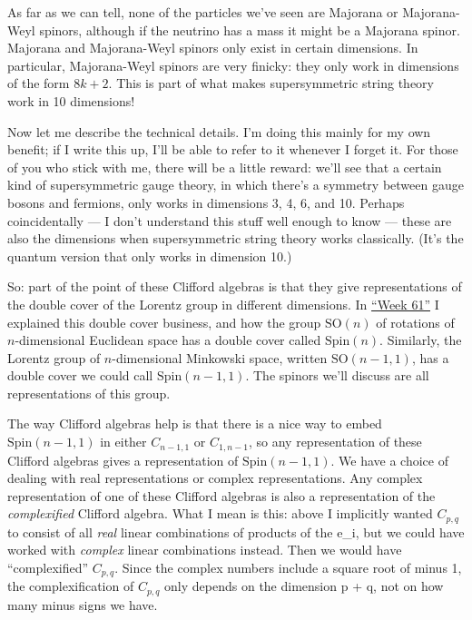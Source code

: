 \documentclass{article}
\begin{document}
As far as we can tell, none of the particles we've seen are Majorana or
Majorana-Weyl spinors, although if the neutrino has a mass it might be a
Majorana spinor. Majorana and Majorana-Weyl spinors only exist in
certain dimensions. In particular, Majorana-Weyl spinors are very
finicky: they only work in dimensions of the form \(8k + 2\). This is
part of what makes supersymmetric string theory work in 10 dimensions!

Now let me describe the technical details. I'm doing this mainly for my
own benefit; if I write this up, I'll be able to refer to it whenever I
forget it. For those of you who stick with me, there will be a little
reward: we'll see that a certain kind of supersymmetric gauge theory, in
which there's a symmetry between gauge bosons and fermions, only works
in dimensions 3, 4, 6, and 10. Perhaps coincidentally --- I don't
understand this stuff well enough to know --- these are also the
dimensions when supersymmetric string theory works classically. (It's
the quantum version that only works in dimension 10.)

So: part of the point of these Clifford algebras is that they give
representations of the double cover of the Lorentz group in different
dimensions. In \protect\hyperlink{week61}{``Week 61''} I explained this
double cover business, and how the group \(\mathrm{SO}(n)\) of rotations
of \(n\)-dimensional Euclidean space has a double cover called
\(\mathrm{Spin}(n)\). Similarly, the Lorentz group of \(n\)-dimensional
Minkowski space, written \(\mathrm{SO}(n-1,1)\), has a double cover we
could call \(\mathrm{Spin}(n-1,1)\). The spinors we'll discuss are all
representations of this group.

The way Clifford algebras help is that there is a nice way to embed
\(\mathrm{Spin}(n-1,1)\) in either \(C_{n-1,1}\) or \(C_{1,n-1}\), so
any representation of these Clifford algebras gives a representation of
\(\mathrm{Spin}(n-1,1)\). We have a choice of dealing with real
representations or complex representations. Any complex representation
of one of these Clifford algebras is also a representation of the
\emph{complexified} Clifford algebra. What I mean is this: above I
implicitly wanted \(C_{p,q}\) to consist of all \emph{real} linear
combinations of products of the e\_i, but we could have worked with
\emph{complex} linear combinations instead. Then we would have
``complexified'' \(C_{p,q}\). Since the complex numbers include a square
root of minus 1, the complexification of \(C_{p,q}\) only depends on the
dimension p + q, not on how many minus signs we have.
\end{document}
